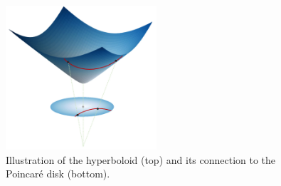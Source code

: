 \begin{figure}
  \centering
  \includegraphics[width=0.5\textwidth]{figs/hyperboloidToPoincare.jpg}

        

        
          


  \caption{Illustration of the hyperboloid (top) and its connection to the Poincaré disk (bottom)\cite{Chami2021representationLearningAlgorithmsHyperbolicSpaces}.}
  \label{fig:hyperboloidToPoincareBall}
\end{figure}